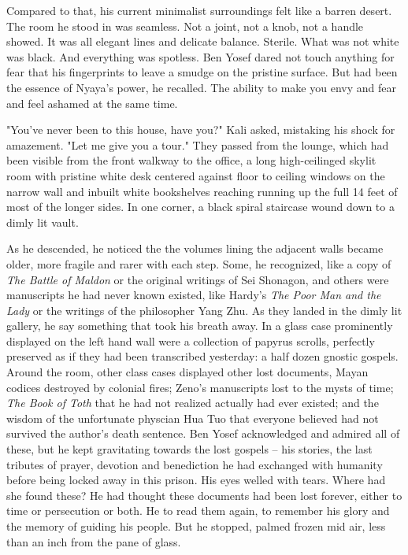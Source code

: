 \documentclass{amsart}
\begin{document}
Compared to that, his current minimalist surroundings felt like a barren desert. The room he stood in was seamless. Not a joint, not a knob, not a handle showed. It was all elegant lines and delicate balance. Sterile. What was not white was black. And everything was spotless. Ben Yosef dared not touch anything for fear that his fingerprints to leave a smudge on the pristine surface. But had been the essence of Nyaya's power, he recalled. The ability to make you envy and fear and feel ashamed at the same time.

"You've never been to this house, have you?" Kali asked, mistaking his shock for amazement. "Let me give you a tour." They passed from the lounge, which had been visible from the front walkway to the office, a long high-ceilinged skylit room with pristine white desk centered against floor to ceiling windows on the narrow wall and inbuilt white bookshelves reaching running up the full 14 feet of most of the longer sides. In one corner, a black spiral staircase wound down to a dimly lit vault. 

As he descended, he noticed the the volumes lining the adjacent walls became older, more fragile and rarer with each step. Some, he recognized, like a copy of \emph{The Battle of Maldon} or the original writings of Sei Shonagon, and others were manuscripts he had never known existed, like Hardy's \emph{The Poor Man and the Lady} or the writings of the philosopher Yang Zhu. As they landed in the dimly lit gallery, he say something that took his breath away. In a glass case prominently displayed on the left hand wall were a collection of papyrus scrolls, perfectly preserved as if they had been transcribed yesterday: a half dozen gnostic gospels. Around the room, other class cases displayed other lost documents, Mayan codices destroyed by colonial fires; Zeno's manuscripts lost to the mysts of time; \emph{The Book of Toth} that he had not realized actually had ever existed; and the wisdom of the unfortunate physcian Hua Tuo that everyone believed had not survived the author's death sentence. Ben Yosef acknowledged and admired all of these, but he kept gravitating towards the lost gospels -- his stories, the last tributes of prayer, devotion and benediction he had exchanged with humanity before being locked away in this prison. His eyes welled with tears. Where had she found these? He had thought these documents had been lost forever, either to time or persecution or both. He to read them again, to remember his glory and the memory of guiding his people. But he stopped, palmed frozen mid air, less than an inch from the pane of glass.
\end{document}
